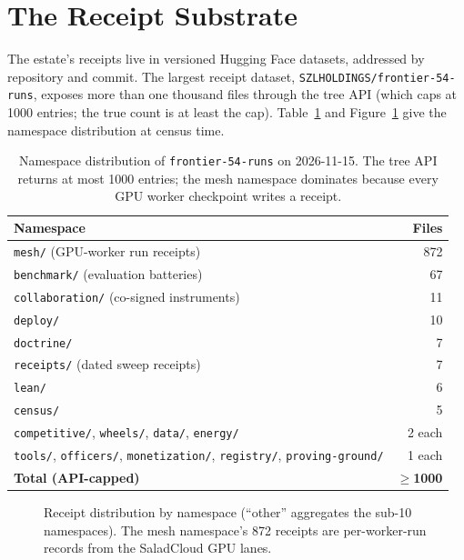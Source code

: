 \section{The Receipt Substrate}
\label{sec:substrate}

The estate's receipts live in versioned Hugging Face datasets, addressed by repository and commit. The largest receipt dataset, \texttt{SZLHOLDINGS/frontier-54-runs}, exposes more than one thousand files through the tree API (which caps at 1000 entries; the true count is at least the cap). Table~\ref{tab:namespaces} and Figure~\ref{fig:namespaces} give the namespace distribution at census time.

\begin{table}[htbp]
\centering
\small
\begin{tabular}{lr}
\toprule
\textbf{Namespace} & \textbf{Files} \\
\midrule
\texttt{mesh/} (GPU-worker run receipts) & 872 \\
\texttt{benchmark/} (evaluation batteries) & 67 \\
\texttt{collaboration/} (co-signed instruments) & 11 \\
\texttt{deploy/} & 10 \\
\texttt{doctrine/} & 7 \\
\texttt{receipts/} (dated sweep receipts) & 7 \\
\texttt{lean/} & 6 \\
\texttt{census/} & 5 \\
\texttt{competitive/}, \texttt{wheels/}, \texttt{data/}, \texttt{energy/} & 2 each \\
\texttt{tools/}, \texttt{officers/}, \texttt{monetization/}, \texttt{registry/}, \texttt{proving-ground/} & 1 each \\
\midrule
\textbf{Total (API-capped)} & \textbf{$\geq$1000} \\
\bottomrule
\end{tabular}
\caption{Namespace distribution of \texttt{frontier-54-runs} on 2026-11-15. The tree API returns at most 1000 entries; the mesh namespace dominates because every GPU worker checkpoint writes a receipt.}
\label{tab:namespaces}
\end{table}

\begin{figure}[htbp]
\centering
{}
\caption{Receipt distribution by namespace (\textquotedblleft other\textquotedblright{} aggregates the sub-10 namespaces). The mesh namespace's 872 receipts are per-worker-run records from the SaladCloud GPU lanes.}
\label{fig:namespaces}
\end{figure}

